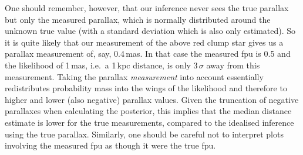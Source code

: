 \documentclass[twocolumn]{aastex62}
\begin{document}
One should remember, however, that our inference never sees the true parallax but only the measured parallax, which is normally distributed around the unknown true value (with a standard deviation which is also only estimated). So it is quite likely that our measurement of the above red clump star gives us a parallax measurement of, say, 0.4\,mas. In that case the measured fpu is 0.5 and the likelihood of 1\,mas, i.e.\ a 1\,kpc distance, is only 3$\,\sigma$ away from this measurement. Taking the parallax \emph{measurement} into account essentially redistributes probability mass into the wings of the likelihood and therefore to higher and lower (also negative) parallax values. Given the truncation of negative parallaxes when calculating the posterior, this implies that the median distance estimate is lower for the true measurements, compared to the idealised inference using the true parallax.
Similarly, one should be careful not to interpret plots involving the measured fpu as though it were the true fpu.



\end{document}

